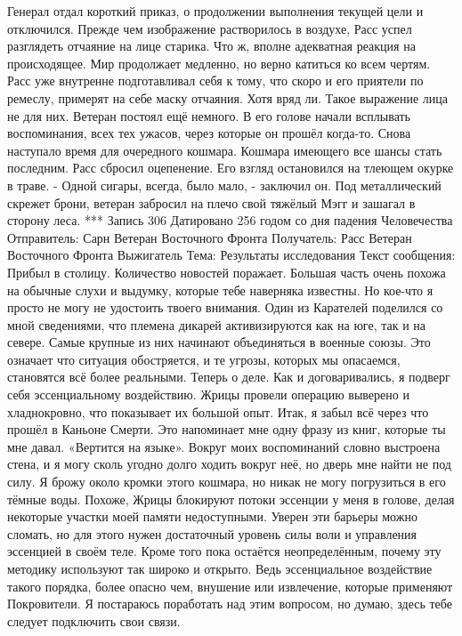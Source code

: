 \documentclass[a4paper, 12pt]{report}
\begin{document}
Генерал отдал короткий приказ, о продолжении выполнения текущей цели и отключился. Прежде чем изображение растворилось в воздухе, Расс успел разглядеть отчаяние на лице старика. Что ж, вполне адекватная реакция на происходящее. Мир продолжает медленно, но верно катиться ко всем чертям. Расс уже внутренне подготавливал себя к тому, что скоро и его приятели по ремеслу, примерят на себе маску отчаяния. Хотя вряд ли. Такое выражение лица не для них.
Ветеран постоял ещё немного. В его голове начали всплывать воспоминания, всех тех ужасов, через которые он прошёл когда-то. Снова наступало время для очередного кошмара. Кошмара имеющего все шансы стать последним. 
Расс сбросил оцепенение. Его взгляд остановился на тлеющем окурке в траве.
 - Одной сигары, всегда, было мало, - заключил он.
Под металлический скрежет брони, ветеран забросил на плечо свой тяжёлый Мэгг и зашагал в сторону леса.
***
Запись 306
Датировано 256 годом со дня падения Человечества
Отправитель: Сарн Ветеран Восточного Фронта
Получатель: Расс Ветеран Восточного Фронта Выжигатель
Тема: Результаты исследования
Текст сообщения:
	 Прибыл в столицу. Количество новостей поражает. Большая часть очень похожа на обычные слухи и выдумку, которые тебе наверняка известны. Но кое-что я просто не могу не удостоить твоего внимания.
 Один из Карателей поделился со мной сведениями, что племена дикарей активизируются как на юге, так и на севере. Самые крупные из них начинают объединяться в военные союзы. Это означает что ситуация обостряется, и те угрозы, которых мы опасаемся, становятся всё более реальными.
Теперь о деле. Как и договаривались, я подверг себя эссенциальному воздействию. Жрицы провели операцию выверено и хладнокровно, что показывает их большой опыт.
Итак, я забыл всё через что прошёл в Каньоне Смерти. Это напоминает мне одну фразу из книг, которые ты мне давал. «Вертится на языке». Вокруг моих воспоминаний словно выстроена стена, и я могу сколь угодно долго ходить вокруг неё, но дверь мне найти не под силу. Я брожу около кромки этого кошмара, но никак не могу погрузиться в его тёмные воды. Похоже, Жрицы блокируют потоки эссенции у меня в голове, делая некоторые участки моей памяти недоступными. Уверен эти барьеры можно сломать, но для этого нужен достаточный уровень силы воли и управления эссенцией в своём теле. Кроме того пока остаётся неопределённым, почему эту методику используют так широко и открыто. Ведь эссенциальное воздействие такого порядка, более опасно чем, внушение или извлечение, которые применяют Покровители. Я постараюсь поработать над этим вопросом, но думаю, здесь тебе следует подключить свои связи.
\end{document}
